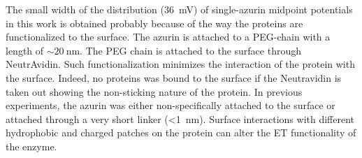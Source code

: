 The small width of the distribution (\SI{36}{\mV}) of single-azurin midpoint potentials in this work is obtained probably because of the way the proteins are functionalized to the surface.
The azurin is attached to a PEG-chain with a length of ${\sim}\SI{20}{\nm}$.
The PEG chain is attached to the surface through NeutrAvidin.
Such functionalization minimizes the interaction of the protein with the surface.
Indeed, no proteins was bound to the surface if the Neutravidin is taken out showing the non-sticking nature of the protein.
In previous experiments, the azurin was either non-specifically attached to the surface or attached through a very short linker (\SI{<1}{\nm}).
Surface interactions with different hydrophobic and charged patches on the protein can alter the ET functionality of the enzyme.

